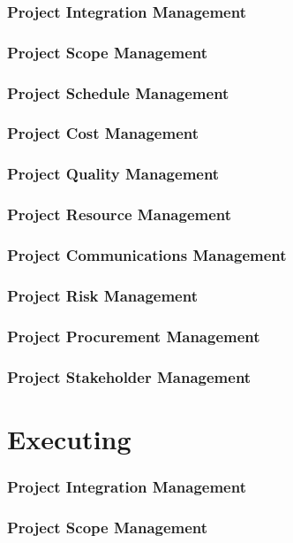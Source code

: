 \documentclass[12pt,letterpaper]{report}
\begin{document}
	\section{Project Integration Management}
	\section{Project Scope Management}
	\section{Project Schedule Management}
	\section{Project Cost Management}
	\section{Project Quality Management}
	\section{Project Resource Management}
	\section{Project Communications Management}
	\section{Project Risk Management}
	\section{Project Procurement Management}
	\section{Project Stakeholder Management}
	
		
	\part{Executing}
	\section{Project Integration Management}
	\section{Project Scope Management}
\end{document}
